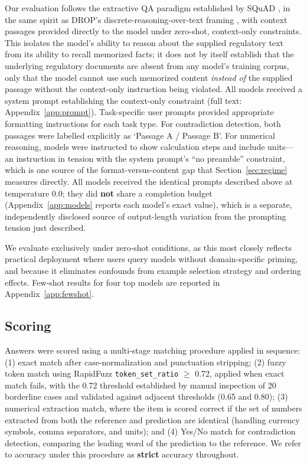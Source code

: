 Our evaluation follows the extractive QA paradigm established by SQuAD \citep{rajpurkar2016squad},
in the same spirit as DROP's discrete-reasoning-over-text framing \citep{dua2019drop}, with context
passages provided directly to the model under zero-shot, context-only constraints. This isolates
the model's ability to reason about the supplied regulatory text from its ability to recall
memorized facts; it does not by itself establish that the underlying regulatory documents are
absent from any model's training corpus, only that the model cannot use such memorized content
\emph{instead of} the supplied passage without the context-only instruction being violated. All
models received a system prompt establishing the context-only constraint (full text:
Appendix~\ref{app:prompt}). Task-specific user prompts provided appropriate formatting instructions
for each task type. For
contradiction detection, both passages were labelled explicitly as `Passage A / Passage B'. For
numerical reasoning, models were instructed to show calculation steps and include units---an
instruction in tension with the system prompt's ``no preamble'' constraint, which is one source of
the format-versus-content gap that Section~\ref{sec:regime} measures directly. All models received
the identical prompts described above at temperature 0.0; they did \textbf{not} share a completion
budget (Appendix~\ref{app:models} reports each model's exact value), which is a separate,
independently disclosed source of output-length variation from the prompting tension just described.

We evaluate exclusively under zero-shot conditions, as this most closely reflects practical
deployment where users query models without domain-specific priming, and because it eliminates
confounds from example selection strategy and ordering effects. Few-shot results for four top
models are reported in Appendix~\ref{app:fewshot}.

\subsection{Scoring}
\label{sec:scoring}

Answers were scored using a multi-stage matching procedure applied in sequence: (1) exact match
after case-normalization and punctuation stripping; (2) fuzzy token match using RapidFuzz
\texttt{token\_set\_ratio} $\geq$ 0.72, applied when exact match fails, with the 0.72 threshold
established by manual inspection of 20 borderline cases and validated against adjacent thresholds
(0.65 and 0.80); (3) numerical extraction match, where the item is scored correct if the set of
numbers extracted from both the reference and prediction are identical (handling currency symbols,
comma separators, and units); and (4) Yes/No match for contradiction detection, comparing the
leading word of the prediction to the reference. We refer to accuracy under this procedure as
\textbf{strict} accuracy throughout.

